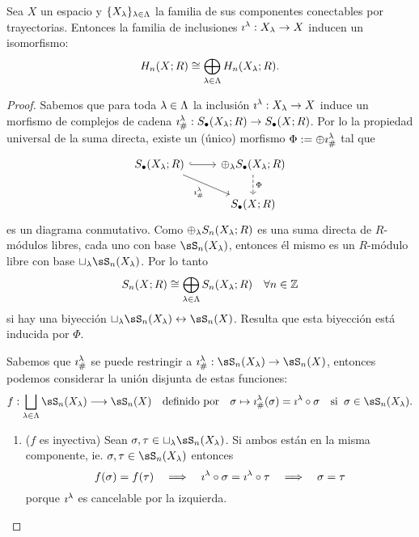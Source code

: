 \documentclass[../../topologia_algebraica]{subfiles}
\begin{document}
\begin{prop}\label{prop:homologia_abre_sumas}
  Sea $X$ un espacio y $\{X_{\lambda}\}_{\lambda\in\Lambda}$ la familia de sus componentes
  conectables por trayectorias. Entonces la familia de inclusiones $\imath^{\lambda}:X_{\lambda}\rightarrow X$
  inducen un isomorfismo:
  \[
    H_n(X;R) \cong \bigoplus_{\lambda\in\Lambda}H_n(X_{\lambda};R).
  \]
\end{prop}
\begin{proof}
  Sabemos que para toda $\lambda\in\Lambda$ la inclusi\'on $\imath^{\lambda}:X_{\lambda}\rightarrow X$ induce un
  morfismo de complejos de cadena $\imath_{\#}^{\lambda}:S_{\bullet}(X_{\lambda};R)\rightarrow S_{\bullet}(X;R)$.
  Por lo la propiedad universal de la suma directa, existe un (\'unico) morfismo
  $\Phi:=\oplus\imath_{\#}^{\lambda}$ tal que
  \[
    \begin{tikzcd}
      S_{\bullet}(X_{\la};R) \arrow[r,hookrightarrow] \arrow[dr,"\imath_{\#}^{\la}"'] &
      \oplus_{\la} S_{\bullet}(X_{\la};R) \arrow[d,dashed,"\Phi"]\\
      & S_{\bullet}(X;R)
    \end{tikzcd}
  \]
  es un diagrama conmutativo. Como $\oplus_{\lambda} S_n(X_{\lambda};R)$ es una suma directa de
  $R$-m\'odulos libres, cada uno con base $\sS_n(X_{\la})$, entonces \'el mismo es un $R$-m\'odulo
  libre con base $\sqcup_{\la}\sS_n(X_{\la})$. Por lo tanto
  \begin{equation}\label{eq:componentes_homologia}
    S_n(X;R)\cong \bigoplus_{\lambda\in\Lambda} S_n(X_{\lambda};R) \quad\forall n\in\mathbb{Z}
  \end{equation}
  si hay una biyecci\'on $\sqcup_{\la}\sS_n(X_{\la})\leftrightarrow \sS_n(X)$. Resulta que
  esta biyecci\'on est\'a inducida por $\Phi$.

  Sabemos que $\imath_{\#}^{\lambda}$ se puede restringir a $\imath_{\#}^{\la}:\sS_n(X_{\la})\ra\sS_n(X)$,
  entonces podemos considerar la uni\'on disjunta de estas funciones:
  \[
    f:\bigsqcup_{\la\in\Lambda}\sS_n(X_{\la}) \lra \sS_n(X) \quad\text{definido por}\quad
    \sigma \mapsto \imath_{\#}^{\la}(\sigma)=\imath^{\la}\circ \sigma\quad\text{si}\;\;
    \sigma\in\sS_n(X_{\la}).
  \]
  \begin{enumerate}
  \item($f$ es inyectiva) Sean $\sigma,\tau\in\sqcup_{\la}\sS_n(X_{\la})$. Si ambos est\'an
    en la misma componente, ie. $\sigma,\tau\in\sS_n(X_{\la})$ entonces
    \[
      f(\sigma)=f(\tau) \quad\Longrightarrow\quad
      \imath^{\lambda}\circ \sigma=\imath^{\lambda}\circ \tau \quad\Longrightarrow\quad
      \sigma=\tau
    \]
    porque $\imath^{\lambda}$ es cancelable por la izquierda.
    

\end{enumerate}
\end{proof}
\end{document}
